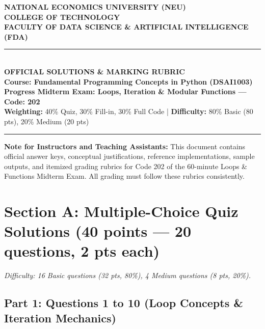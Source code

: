 \documentclass[11pt,a4paper]{article}
\begin{document}
\begin{center}
  {\Large\textbf{NATIONAL ECONOMICS UNIVERSITY (NEU)}}\\[0.06cm]
  {\large\textbf{COLLEGE OF TECHNOLOGY}}\\[0.04cm]
  {\large\textbf{FACULTY OF DATA SCIENCE \& ARTIFICIAL INTELLIGENCE (FDA)}}\\[0.12cm]
  \rule{\textwidth}{1.2pt}\\[0.12cm]
  {\LARGE\bfseries\color{primaryblue}OFFICIAL SOLUTIONS \& MARKING RUBRIC}\\[0.06cm]
  {\large\textbf{Course: Fundamental Programming Concepts in Python (DSAI1003)}}\\[0.06cm]
  {\normalsize\textbf{Progress Midterm Exam: Loops, Iteration \& Modular Functions --- Code: 202}}\\[0.05cm]
  {\footnotesize\textbf{Weighting:} 40\% Quiz, 30\% Fill-in, 30\% Full Code \quad | \quad \textbf{Difficulty:} 80\% Basic (80 pts), 20\% Medium (20 pts)}\\[0.08cm]
  \rule{\textwidth}{0.6pt}
\end{center}

\vspace{0.05cm}

\begin{tcolorbox}[colback=green!8, colframe=correctgreen, arc=1.2mm, boxrule=0.6pt, left=2.0mm, right=2.0mm, top=0.8mm, bottom=0.8mm]
\small
\textbf{Note for Instructors and Teaching Assistants:}
This document contains official answer keys, conceptual justifications, reference implementations, sample outputs, and itemized grading rubrics for Code 202 of the 60-minute Loops \& Functions Midterm Exam. All grading must follow these rubrics consistently.
\end{tcolorbox}

\vspace{0.05cm}

\section*{Section A: Multiple-Choice Quiz Solutions (40 points --- 20 questions, 2 pts each)}
\textit{Difficulty: 16 Basic questions (32 pts, 80\%), 4 Medium questions (8 pts, 20\%).}

\subsection*{Part 1: Questions 1 to 10 (Loop Concepts \& Iteration Mechanics)}
\end{document}
